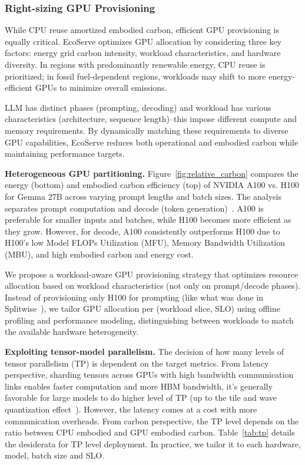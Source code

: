 \subsubsection{\textbf{Right-sizing GPU Provisioning}} 
\label{sec:rightsize}
While CPU reuse amortized embodied carbon, efficient GPU provisioning is equally critical. EcoServe optimizes GPU allocation by considering three key factors: energy grid carbon intensity, workload characteristics, and hardware diversity. In regions with predominantly renewable energy, CPU reuse is prioritized; in fossil fuel-dependent regions, workloads may shift to more energy-efficient GPUs to minimize overall emissions.

LLM has distinct phases (prompting, decoding) and workload has various characteristics (architecture, sequence length)--this impose different compute and memory requirements. By dynamically matching these requirements to diverse GPU capabilities, EcoServe reduces both operational and embodied carbon while maintaining performance targets.




\textbf{Heterogeneous GPU partitioning.} 
Figure~\ref{fig:relative_carbon} compares the energy (bottom) and embodied carbon efficiency (top) of NVIDIA A100 vs. H100 for Gemma 27B across varying prompt lengths and batch sizes. The analysis separates prompt computation and decode (token generation)~\cite{patel2023splitwise}. A100 is preferable for smaller inputs and batches, while H100 becomes more efficient as they grow. However, for decode, A100 consistently outperforms H100 due to H100's low Model FLOPs Utilization (MFU), Memory Bandwidth Utilization (MBU), and high embodied carbon and energy cost.










We propose a workload-aware GPU provisioning strategy that optimizes resource allocation based on workload characteristics (not only on prompt/decode phases). Instead of provisioning only H100 for prompting (like what was done in Splitwise~\cite{patel2023splitwise}), we tailor GPU allocation per (workload slice, SLO) using offline profiling and performance modeling, distinguishing between workloads to match the available hardware heterogeneity.




\textbf{Exploiting tensor-model parallelism.}
The decision of how many levels of tensor parallelism (TP) is dependent on the target metrics. From latency perspective, sharding tensors across GPUs with high bandwidth communication links enables faster computation and more HBM bandwidth, it's generally favorable for large models to do higher level of TP (up to the tile and wave quantization effect~\cite{nvidia_matmul_guide}). However, the latency comes at a cost with more communication overheads. From carbon perspective, the TP level depends on the ratio between CPU embodied and GPU embodied carbon. Table~\ref{tab:tp} details the desiderata for TP level deployment. In practice, we tailor it to each hardware, model, batch size and SLO. %





